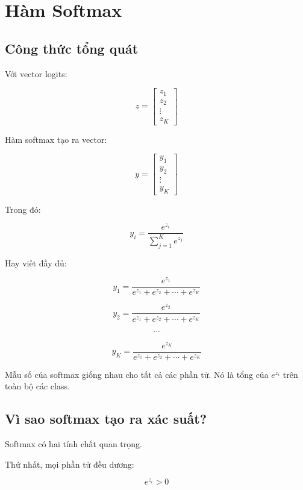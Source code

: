 \documentclass[12pt,a4paper]{report}
\begin{document}
\chapter{Hàm Softmax}

\section{Công thức tổng quát}

Với vector logits:

\[
    z =
    \begin{bmatrix}
    z_1\\
    z_2\\
    \vdots\\
    z_K
    \end{bmatrix}
\]

Hàm softmax tạo ra vector:

\[
    y =
    \begin{bmatrix}
    y_1\\
    y_2\\
    \vdots\\
    y_K
    \end{bmatrix}
\]

Trong đó:

\[
    y_i =
    \frac{e^{z_i}}
    {\sum_{j=1}^{K} e^{z_j}}
\]

Hay viết đầy đủ:

\[
    y_1 =
    \frac{e^{z_1}}
    {e^{z_1}+e^{z_2}+\cdots+e^{z_K}}
\]

\[
    y_2 =
    \frac{e^{z_2}}
    {e^{z_1}+e^{z_2}+\cdots+e^{z_K}}
\]

\[
    \cdots
\]

\[
    y_K =
    \frac{e^{z_K}}
    {e^{z_1}+e^{z_2}+\cdots+e^{z_K}}
\]

\begin{ghinho}
Mẫu số của softmax giống nhau cho tất cả các phần tử. Nó là tổng của $e^{z_i}$ trên toàn bộ các class.
\end{ghinho}

\section{Vì sao softmax tạo ra xác suất?}

Softmax có hai tính chất quan trọng.

Thứ nhất, mọi phần tử đều dương:

\[
    e^{z_i} > 0
\]
\end{document}
